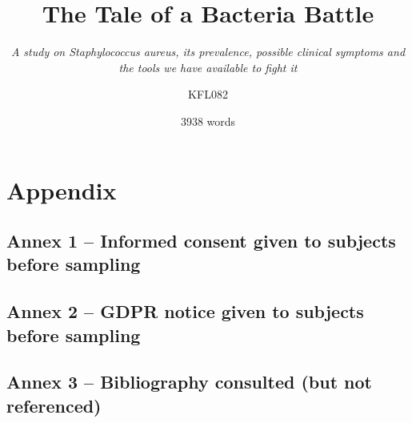 \documentclass[fontsize=12pt,twoside=semi,openright,numbers=noenddot,parskip=half]{scrbook}
\title{The Tale of a Bacteria Battle}
\subtitle{\emph{A study on \emph{Staphylococcus aureus}, its prevalence, possible clinical symptoms and the tools we have available to fight it}}
\author{KFL082}
\date{3938 words}
\begin{document}
\maketitle
\cleardoublepage
\renewcommand{\thepage}{\arabic{page}}
\frontmatter
\mainmatter\printindex\tableofcontents




%

\backmatter
\renewcommand{\thepage}{\Roman{page}}\setcounter{page}{0}
\clearpage
\printbibliography[title={Works referenced}]
\part{Appendix}\appendix
\chapter{Annex 1 – Informed consent given to subjects before sampling}

\clearpage\appendix\chapter{Annex 2 – GDPR notice given to subjects before sampling}

\chapter{Annex 3 – Bibliography consulted (but not referenced)}

\end{document}
